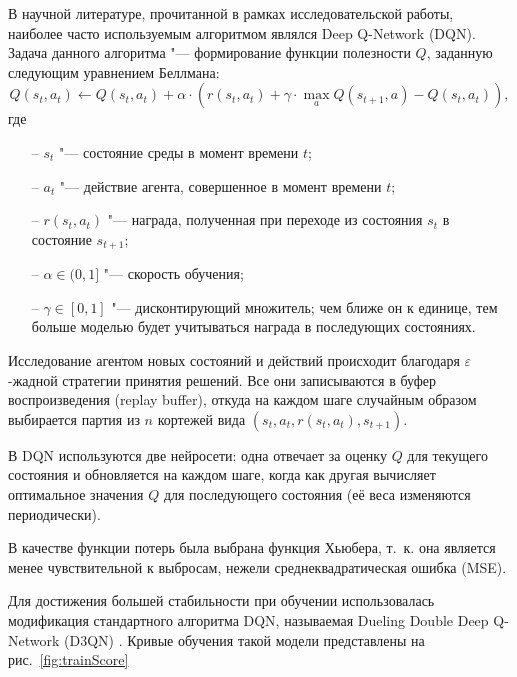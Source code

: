 В научной литературе, прочитанной в рамках исследовательской работы, наиболее часто используемым алгоритмом являлся Deep Q-Network (DQN). Задача данного алгоритма "--- формирование функции полезности \(Q\), заданную следующим уравнением Беллмана: \[Q(s_t, a_t) \leftarrow Q(s_t, a_t) + \alpha \cdot (r(s_t, a_t) + \gamma \cdot \max_a Q(s_{t+1}, a) - Q(s_t, a_t)),\] где 
\begin{itemize}
	\item[--] \(s_t\) "--- состояние среды в момент времени \(t\); 
	\item[--]  \(a_t\) "--- действие агента, совершенное в момент времени \(t\);
	\item[--] \(r(s_t, a_t)\) "--- награда, полученная при переходе из состояния \(s_t\) в состояние \(s_{t+1}\);
	\item[--] \(\alpha \in (0, 1]\) "--- скорость обучения;
	\item[--] \(\gamma \in [0, 1]\) "--- дисконтирующий множитель; чем ближе он к единице, тем больше моделью будет учитываться награда в последующих состояниях.
\end{itemize}

Исследование агентом новых состояний и действий происходит благодаря $\varepsilon$-жадной стратегии принятия решений. Все они записываются в буфер воспроизведения (replay buffer), откуда на каждом шаге случайным образом выбирается партия из \(n\) кортежей вида \((s_t, a_t, r(s_t, a_t), s_{t+1})\).

В DQN используются две нейросети: одна отвечает за оценку \(Q\) для текущего состояния и обновляется на каждом шаге, когда как другая вычисляет оптимальное значения \(Q\) для последующего состояния (её веса изменяются периодически).

В качестве функции потерь была выбрана функция Хьюбера, т.~к. она является менее чувствительной к выбросам, нежели среднеквадратическая ошибка (MSE).

Для достижения большей стабильности при обучении использовалась модификация стандартного алгоритма DQN, называемая Dueling Double Deep Q-Network (D3QN) \cite{wang2016dueling,hasselt2016deep}. Кривые обучения такой модели представлены на рис.~\ref{fig:trainScore}


